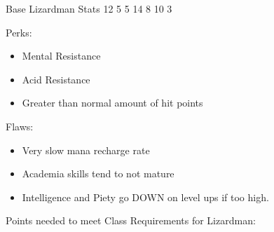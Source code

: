 \documentclass[12pt]{article}
\newcommand{\WviiTwoColumnSetup}{\raggedcolumns\RaggedRight}
\begin{document}
Base Lizardman Stats 12 5 5 14 8 10 3

\begin{multicols}{2}\WviiTwoColumnSetup
Perks:

\begin{itemize}
\item
  Mental Resistance
\item
  Acid Resistance
\item
  Greater than normal amount of hit points
\end{itemize}
\columnbreak

Flaws:

\begin{itemize}
\item
  Very slow mana recharge rate
\item
  Academia skills tend to not mature
\item
  Intelligence and Piety go DOWN on level ups if too high.
\end{itemize}
\end{multicols}

Points needed to meet Class Requirements for Lizardman:
\end{document}
